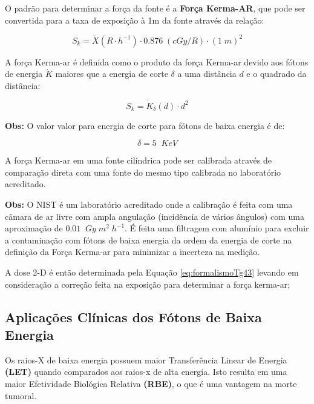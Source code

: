 \documentclass[11pt,a4paper]{article}
\begin{document}
			O padrão para determinar a força da fonte é a \textbf{\textcolor{CarnationPink}{Força Kerma-AR}}, que pode ser convertida para a taxa de exposição à 1m da fonte através da relação:

				\begin{equation}
					S_k = \dot{X}(R \cdot h^{-1}) \cdot 0.876 \; (cGy/R) \cdot (1 \; m)^2
				\end{equation}
			
			A força Kerma-ar é definida como o produto da força Kerma-ar devido aos fótons de energia $\dot{K}$ maiores que a energia de corte $\delta$ a uma distância $d$ e o quadrado da distância:

				\begin{equation}
					S_k = \dot{K}_\delta (d) \cdot d^2
				\end{equation}

				\textbf{\textcolor{CarnationPink}{Obs:} } O valor valor para energia de corte para fótons de baixa energia é de:

				$$\delta = 5 \; \; KeV$$
				
			A força Kerma-ar em uma fonte cilíndrica pode ser calibrada através de comparação direta com uma fonte do mesmo tipo calibrada no laboratório acreditado.

			\textbf{\textcolor{CarnationPink}{Obs:}} O NIST é um laboratório acreditado onde a calibração é feita com uma câmara de ar livre com ampla angulação (incidência de vários ângulos) com uma aproximação de $0.01 \; \; Gy \; m^2 \; h^{-1}$. É feita uma filtragem com alumínio para excluir a contaminação com fótons de baixa energia da ordem da energia de corte na definição da Força Kerma-ar para minimizar a incerteza na medição.

			A dose 2-D é então determinada pela Equação \ref{eq:formalismoTg43} levando em consideração a correção feita na exposição para determinar a força kerma-ar;

		\subsection{Aplicações Clínicas dos Fótons de Baixa Energia}

			Os raios-X de baixa energia possuem maior Transferência Linear de Energia \textbf{\textcolor{CarnationPink}{(LET)}} quando comparados aos raios-x de alta energia. Isto resulta em uma maior Efetividade Biológica Relativa \textbf{\textcolor{CarnationPink}{(RBE)}}, o que é uma vantagem na morte tumoral.
\end{document}
